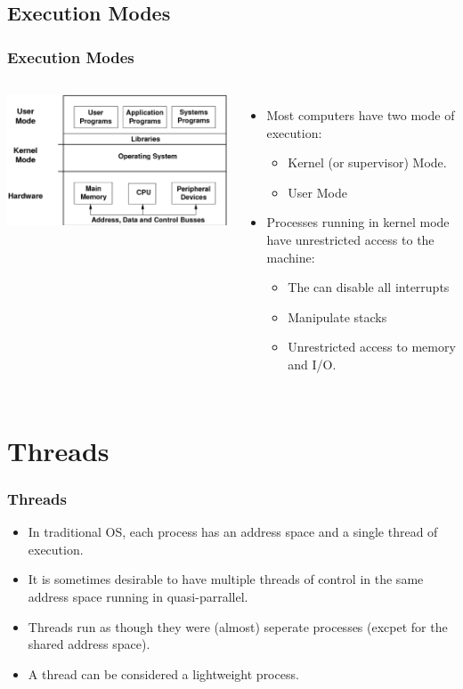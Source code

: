 \documentclass{beamer}
\begin{document}
\subsection{Execution Modes}
\begin{frame}
\frametitle{Execution Modes}
\begin{columns}[c]
\includegraphics[scale=0.35]{exec.png}
\begin{itemize}
\item Most computers have two mode of execution:
\begin{itemize}
\item Kernel (or supervisor) Mode.
\item User Mode
\end{itemize}
\item Processes running in kernel mode have unrestricted access to the machine:
\begin{itemize}
\item The can disable all interrupts
\item Manipulate stacks
\item Unrestricted access to memory and I/O.
\end{itemize}
\end{itemize}
\end{columns}
\end{frame}
\section{Threads}
\begin{frame}
\frametitle{Threads}
\begin{itemize}
\item In traditional OS, each process has an address space and a single thread of execution.
\item It is sometimes desirable to have multiple threads of control in the same address space running in quasi-parrallel.
\item Threads run as though they were (almost) seperate processes (excpet for the shared address space).
\item A thread can be considered a {\color{red}lightweight} process.
\end{itemize}
\end{frame}
\end{document}
